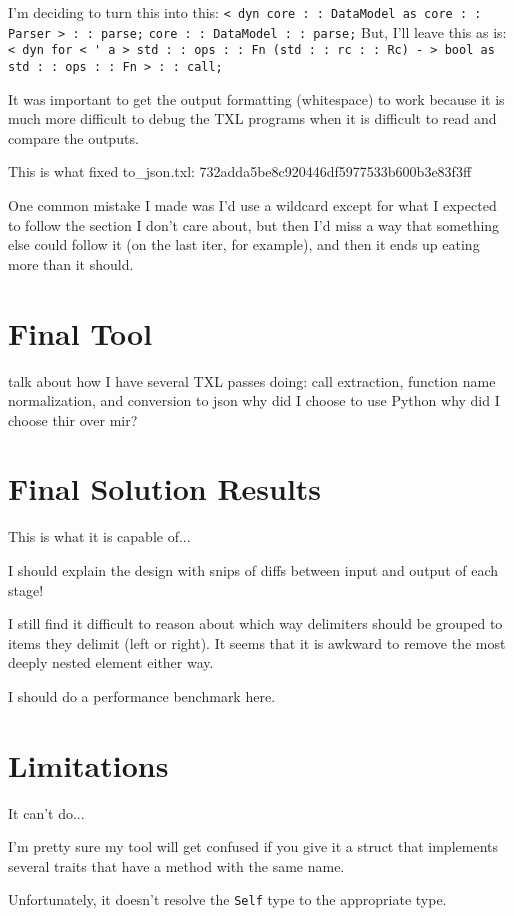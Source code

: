 \documentclass[11pt]{article}
\begin{document}
I'm deciding to turn this into this:
\lstinline{< dyn core : : DataModel as core : : Parser > : : parse;}
\lstinline{core : : DataModel : : parse;}
But, I'll leave this as is:
\lstinline{< dyn for < ' a > std : : ops : : Fn (std : : rc : : Rc) - > bool as std : : ops : : Fn > : : call;}

It was important to get the output formatting (whitespace) to work because it is much more difficult to debug the TXL programs when it is difficult to read and compare the outputs.

This is what fixed to_json.txl: 732adda5be8c920446df5977533b600b3e83f3ff

One common mistake I made was I'd use a wildcard except for what I expected to follow the section I don't care about, but then I'd miss a way that something else could follow it (on the last iter, for example), and then it ends up eating more than it should.

\section{Final Tool} %
talk about how I have several TXL passes doing: call extraction, function name normalization, and conversion to json
why did I choose to use Python
why did I choose thir over mir?

\section{Final Solution Results}
This is what it is capable of...

I should explain the design with snips of diffs between input and output of each stage!

I still find it difficult to reason about which way delimiters should be grouped to items they delimit (left or right).
It seems that it is awkward to remove the most deeply nested element either way.

I should do a performance benchmark here.

\section{Limitations}
It can't do...

I'm pretty sure my tool will get confused if you give it a struct that implements several traits that have a method with the same name.

Unfortunately, it doesn't resolve the \lstinline{Self} type to the appropriate type.
\end{document}
